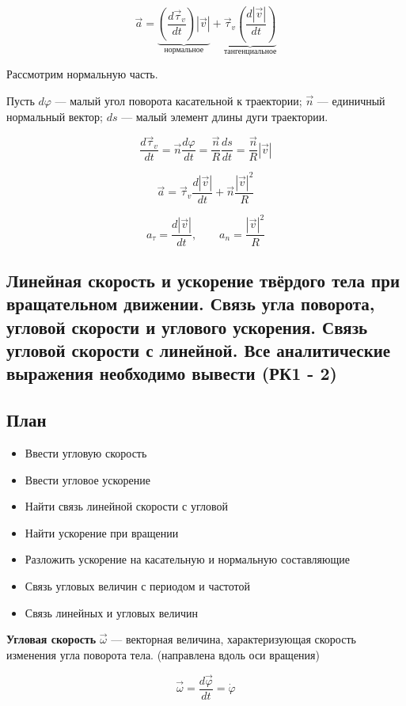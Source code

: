\documentclass[a4paper,12pt]{article}
\begin{document}
\[
\vec a
=
\underbrace{
\left(\frac{d\vec \tau_v}{dt}\right) |\vec v|
}_{\text{нормальное}}
+
\underbrace{
\vec \tau_v \left(\frac{d|\vec v|}{dt}\right)
}_{\text{тангенциальное}}
\]

Рассмотрим нормальную часть.

Пусть $d\varphi$ — малый угол поворота касательной к траектории; 
$\vec n$ — единичный нормальный вектор; 
$ds$ — малый элемент длины дуги траектории.

\[
\frac{d\vec \tau_v}{dt}
=
\vec{n}\frac{d\varphi}{dt}
=
\frac{\vec{n}}{R}\frac{ds}{dt}
=
\frac{\vec n}{R} |\vec v|
\]

\[
\vec a
=
\vec \tau_v \frac{d|\vec v|}{dt}
+
\vec n \frac{|\vec v|^2}{R}
\]

\[
a_\tau
=
\frac{d|\vec v|}{dt},
\qquad
a_n
=
\frac{|\vec v|^2}{R}
\] 

\subsection{Линейная скорость и ускорение твёрдого тела при вращательном движении. Связь угла поворота, угловой скорости и углового ускорения. Связь угловой скорости с линейной. Все аналитические выражения необходимо вывести (РК1 - 2)}

\subsection*{План}
\begin{itemize}
\item Ввести угловую скорость
\item Ввести угловое ускорение
\item Найти связь линейной скорости с угловой
\item Найти ускорение при вращении
\item Разложить ускорение на касательную и нормальную составляющие
\item Связь угловых величин с периодом и частотой
\item Связь линейных и угловых величин
\end{itemize}

\begin{definitionbox}
\textbf{Угловая скорость} $\vec \omega$ — векторная величина, характеризующая скорость изменения угла поворота тела.  (направлена вдоль оси вращения)
\end{definitionbox}

\[
\vec \omega
=
\frac{d\vec \varphi}{dt}
=
\dot{\varphi}
\]
\end{document}
